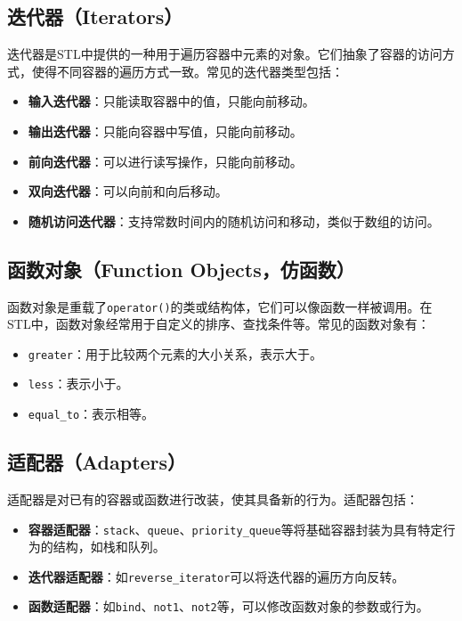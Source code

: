 \documentclass{article}
\begin{document}
\subsection{迭代器（Iterators）}
迭代器是STL中提供的一种用于遍历容器中元素的对象。它们抽象了容器的访问方式，使得不同容器的遍历方式一致。常见的迭代器类型包括：

\begin{itemize}
    \item \textbf{输入迭代器}：只能读取容器中的值，只能向前移动。
    \item \textbf{输出迭代器}：只能向容器中写值，只能向前移动。
    \item \textbf{前向迭代器}：可以进行读写操作，只能向前移动。
    \item \textbf{双向迭代器}：可以向前和向后移动。
    \item \textbf{随机访问迭代器}：支持常数时间内的随机访问和移动，类似于数组的访问。
\end{itemize}

\subsection{函数对象（Function Objects，仿函数）}
函数对象是重载了\texttt{operator()}的类或结构体，它们可以像函数一样被调用。在STL中，函数对象经常用于自定义的排序、查找条件等。常见的函数对象有：

\begin{itemize}
    \item \texttt{greater}：用于比较两个元素的大小关系，表示大于。
    \item \texttt{less}：表示小于。
    \item \texttt{equal\_to}：表示相等。
\end{itemize}

\subsection{适配器（Adapters）}
适配器是对已有的容器或函数进行改装，使其具备新的行为。适配器包括：

\begin{itemize}
    \item \textbf{容器适配器}：\texttt{stack}、\texttt{queue}、\texttt{priority\_queue}等将基础容器封装为具有特定行为的结构，如栈和队列。
    \item \textbf{迭代器适配器}：如\texttt{reverse\_iterator}可以将迭代器的遍历方向反转。
    \item \textbf{函数适配器}：如\texttt{bind}、\texttt{not1}、\texttt{not2}等，可以修改函数对象的参数或行为。
\end{itemize}
\end{document}
